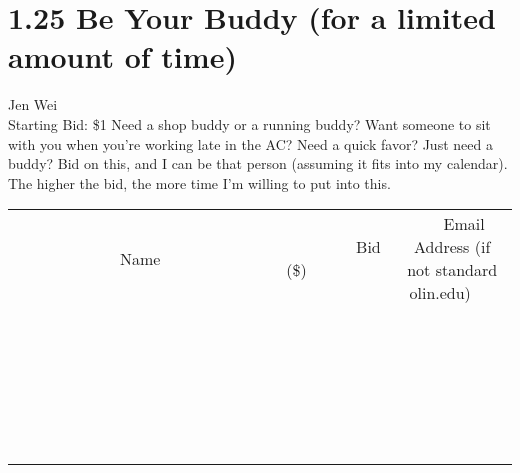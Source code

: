\documentclass[11pt]{article}
\begin{document}
\section*{1.25 Be Your Buddy (for a limited amount of time)}
Jen Wei
\\
Starting Bid: \$1
\newline
Need a shop buddy or a running buddy? Want someone to sit with you when you're working late in the AC? Need a quick favor? Just need a buddy? Bid on this, and I can be that person (assuming it fits into my calendar). The higher the bid, the more time I'm willing to put into this.
\\[6ex]
\begin{tabular}{c c c}
~~~~~~~~~~~~~Name~~~~~~~~~~~~~ & ~~~~~~~~~Bid (\$)~~~~~~~~~  & ~~~Email Address (if not standard olin.edu)~~~\\
 & & \\
\hline
 & & \\
\hline
 & & \\
\hline
 & & \\
\hline
 & & \\
\hline
 & & \\
\hline
 & & \\
\hline
 & & \\
\hline
 & & \\
\hline
 & & \\
\hline
 & & \\
\hline
 & & \\
\hline
 & & \\
\hline
 & & \\
\hline
 & & \\
\hline
 & & \\
\hline
 & & \\
\hline
 & & \\
\hline
 & & \\
\hline
 & & \\
\hline
 & & \\
\hline
 & & \\
\hline
 & & \\
\hline
 & & \\
\hline
 & & \\
\hline
 & & \\
\hline
\end{tabular}
\newpage
\end{document}
